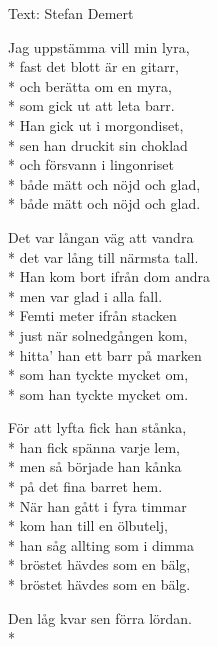 \begin{SongText}
\begin{SongInfo}
    Text: Stefan Demert
\end{SongInfo}
\begin{SongVerse}
Jag uppstämma vill min lyra,\\*%
fast det blott är en gitarr,\\*%
och berätta om en myra,\\*%
som gick ut att leta barr.\\*%
Han gick ut i morgondiset,\\*%
sen han druckit sin choklad\\*%
och försvann i lingonriset\\*%
både mätt och nöjd och glad,\\*%
både mätt och nöjd och glad.
\end{SongVerse}
\begin{SongVerse}
Det var långan väg att vandra\\*%
det var lång till närmsta tall.\\*%
Han kom bort ifrån dom andra\\*%
men var glad i alla fall.\\*%
Femti meter ifrån stacken\\*%
just när solnedgången kom,\\*%
hitta' han ett barr på marken\\*%
som han tyckte mycket om,\\*%
som han tyckte mycket om.
\end{SongVerse}
\begin{SongVerse}
För att lyfta fick han stånka,\\*%
han fick spänna varje lem,\\*%
men så började han kånka\\*%
på det fina barret hem.\\*%
När han gått i fyra timmar\\*%
kom han till en ölbutelj,\\*%
han såg allting som i dimma\\*%
bröstet hävdes som en bälg,\\*%
bröstet hävdes som en bälg.
\end{SongVerse}
\begin{SongVerse}
Den låg kvar sen förra lördan.\\*%

\end{SongVerse}
\end{SongText}
